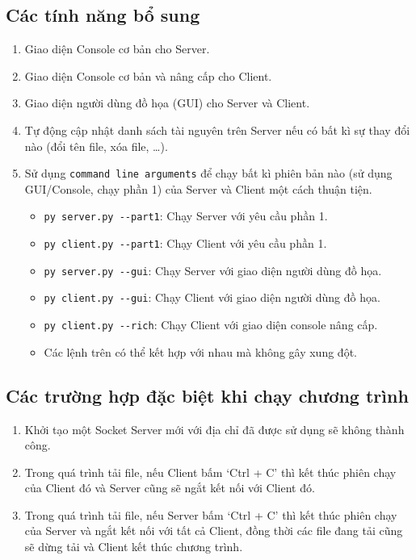 \documentclass[a4paper,12pt]{report}
\begin{document}
\subsection{Các tính năng bổ sung}
\begin{enumerate}
  \item Giao diện Console cơ bản cho Server.
  \item Giao diện Console cơ bản và nâng cấp cho Client.
  \item Giao diện người dùng đồ họa (GUI) cho Server và Client.
  \item Tự động cập nhật danh sách tài nguyên trên Server nếu có bất kì sự thay đổi nào (đổi tên file, xóa file, \ldots).
  \item Sử dụng \verb|command line arguments| để chạy bất kì phiên bản nào (sử dụng GUI/Console, chạy phần 1) của Server và Client một cách thuận tiện.
        \begin{itemize}
          \item \verb|py server.py --part1|: Chạy Server với yêu cầu phần 1.
          \item \verb|py client.py --part1|: Chạy Client với yêu cầu phần 1.
          \item \verb|py server.py --gui|: Chạy Server với giao diện người dùng đồ họa.
          \item \verb|py client.py --gui|: Chạy Client với giao diện người dùng đồ họa.
          \item \verb|py client.py --rich|: Chạy Client với giao diện console nâng cấp.
          \item Các lệnh trên có thể kết hợp với nhau mà không gây xung đột.
        \end{itemize}
\end{enumerate}
\subsection{Các trường hợp đặc biệt khi chạy chương trình}
\begin{enumerate}
  \item Khởi tạo một Socket Server mới với địa chỉ đã được sử dụng sẽ không thành công.
  \item Trong quá trình tải file, nếu Client bấm `Ctrl + C' thì kết thúc phiên chạy của Client đó và Server cũng sẽ ngắt kết nối với Client đó.
  \item Trong quá trình tải file, nếu Server bấm `Ctrl + C' thì kết thúc phiên chạy của Server và ngắt kết nối với tất cả Client, đồng thời các file đang tải cũng sẽ dừng tải và Client kết thúc chương trình.
\end{enumerate}
\end{document}
